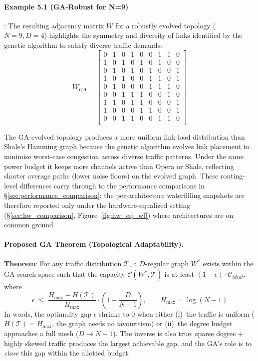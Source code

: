 \documentclass{article}
\begin{document}
    \paragraph{Example 5.1 (GA-Robust for N=9)}:
    The resulting adjacency matrix $W$ for a robustly evolved topology ($N=9, D=4$) highlights the symmetry and diversity of links identified by the genetic algorithm to satisfy diverse traffic demands:
    \[
        W_{GA} = 
        \begin{bmatrix}
            0 & 1 & 0 & 1 & 0 & 0 & 1 & 1 & 0 \\
            1 & 0 & 1 & 0 & 1 & 0 & 1 & 0 & 0 \\
            0 & 1 & 0 & 1 & 0 & 1 & 0 & 0 & 1 \\
            1 & 0 & 1 & 0 & 0 & 1 & 1 & 0 & 1 \\
            0 & 1 & 0 & 0 & 0 & 1 & 1 & 1 & 0 \\
            0 & 0 & 1 & 1 & 1 & 0 & 0 & 1 & 0 \\
            1 & 1 & 0 & 1 & 1 & 0 & 0 & 0 & 1 \\
            1 & 0 & 0 & 0 & 1 & 1 & 0 & 0 & 1 \\
            0 & 0 & 1 & 1 & 0 & 0 & 1 & 1 & 0 \\
        \end{bmatrix}
    \]

    The GA-evolved topology produces a more uniform link-load distribution than Shale's Hamming graph because the genetic algorithm evolves link placement to minimise worst-case congestion across diverse traffic patterns.  Under the same power budget it keeps more channels active than Opera or Shale, reflecting shorter average paths (lower noise floors) on the evolved graph.  These routing-level differences carry through to the performance comparisons in \S\ref{sec:performance_comparison}; the per-architecture waterfilling snapshots are therefore reported only under the hardware-equalized setting (\S\ref{sec:hw_comparison}, Figure~\ref{fig:hw_eq_wf}) where architectures are on common ground.

    \paragraph{Proposed GA Theorem (Topological Adaptability).}
    \textbf{Theorem}: For any traffic distribution $\mathcal{T}$, a $D$-regular graph $W^*$ exists within the GA search space such that the capacity $\mathcal{C}(W^*, \mathcal{T})$ is at least $(1 - \epsilon) \cdot \mathcal{C}_{ideal}$, where
    \[
        \epsilon \;\le\; \frac{H_{\max} - H(\mathcal{T})}{H_{\max}} \cdot \left(1 - \frac{D}{N{-}1}\right), \qquad H_{\max} = \log(N{-}1)
    \]
    In words, the optimality gap $\epsilon$ shrinks to $0$ when either (i)~the traffic is uniform ($H(\mathcal{T}) = H_{\max}$, the graph needs no favouritism) or (ii)~the degree budget approaches a full mesh ($D \to N{-}1$).  The inverse is also true: sparse degree + highly skewed traffic produces the largest achievable gap, and the GA's role is to \emph{close} this gap within the allotted budget.
\end{document}
